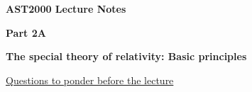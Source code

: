 




\vspace*{2cm}

{\centerline{\bf\huge AST2000 Lecture Notes}}

\vspace*{1cm}

\newcommand{\PartName}{2A}
\newcommand{\refproblem}[1]{\PartName.\ref{#1}}


{\centerline{\bf\LARGE Part \PartName}}\vspace*{0.25cm}
{\centerline{\bf\LARGE The special theory of relativity: Basic principles }}

\vspace*{1cm}

{\centerline{\underline{\LARGE Questions to ponder before the lecture}}}

\vspace*{1cm}

